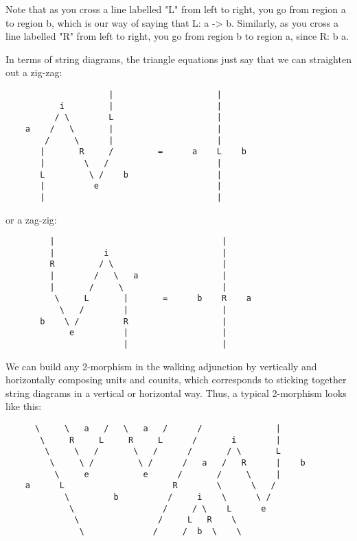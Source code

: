Note that as you cross a line labelled "L" from left to right,
you go from region a to region b, which is our way of saying that L: a
-> b.  Similarly, as you cross a line labelled "R" from
left to right, you go from region b to region a, since R: b \to  a.

In terms of string diagrams, the triangle equations just say that we can
straighten out a zig-zag:

\begin{verbatim}
                     |                     |  
           i         |                     |
          / \        L                     |
    a    /   \       |                     |
        /     \      |                     |
       |       R     /         =      a    L    b
       |        \   /                      | 
       L         \ /    b                  |
       |          e                        |
       |                                   |  
\end{verbatim}
    
or a zag-zig:
 
\begin{verbatim}
         |                                  |   
         |          i                       |
         R         / \                      |
         |        /   \   a                 |
         |       /     \                    |
          \     L       |       =      b    R    a          
           \   /        |                   |
       b    \ /         R                   |
             e          |                   |
                        |                   |
\end{verbatim}
    
We can build any 2-morphism in the walking adjunction by vertically
and horizontally composing units and counits, which corresponds to
sticking together string diagrams in a vertical or horizontal way.
Thus, a typical 2-morphism looks like this:

\begin{verbatim}
      \     \   a   /   \   a   /      /               |
       \     R     L     R     L      /       i        |
        \     \   /       \   /      /       / \       L
         \     \ /         \ /      /   a   /   R      |    b
          \     e           e      /       /     \     |
    a      L                      R        \      \   / 
            \         b          /     i    \      \ / 
             \                  /     / \    L      e
              \                /     L   R    \       
               \              /     /  b  \    \  

\end{verbatim}
    
